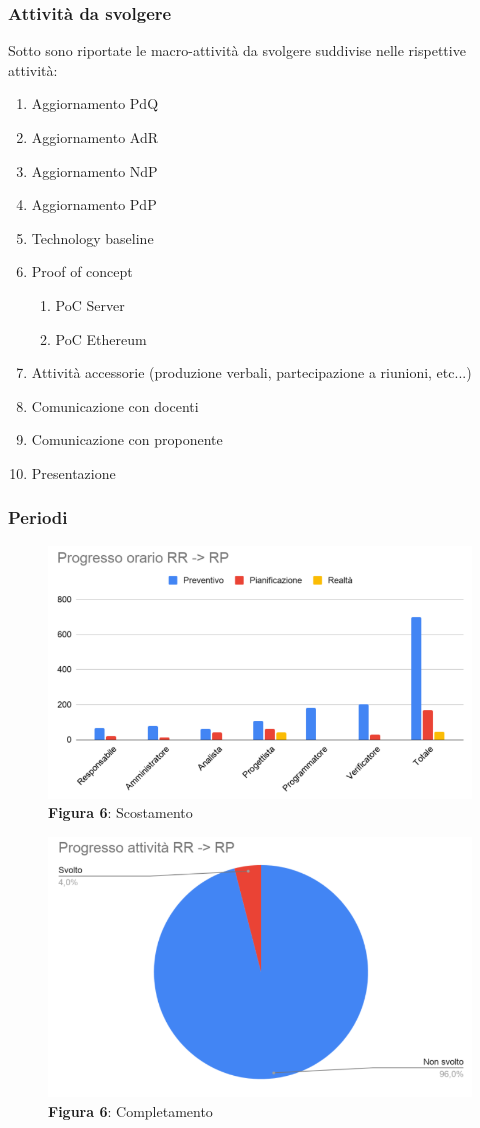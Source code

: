 \subsubsection{Attività da svolgere}
Sotto sono riportate le macro-attività da svolgere suddivise nelle rispettive attività:
\begin{enumerate}
	\item Aggiornamento PdQ
	\item Aggiornamento AdR
	\item Aggiornamento NdP
	\item Aggiornamento PdP
	\item Technology baseline
	\item Proof of concept
	\begin{enumerate}
		\item PoC Server
		\item PoC Ethereum
	\end{enumerate}
	\item Attività accessorie (produzione verbali, partecipazione a riunioni, etc...)
	\item Comunicazione con docenti
	\item Comunicazione con proponente
	\item Presentazione
\end{enumerate}

\subsubsection{Periodi}

\begin{figure}[H]
	\centering
	\includegraphics[width=0.7\linewidth]{res/images/scostamento2.1.png}
	\caption*{\textbf{Figura 6}: Scostamento}
	\label{fig:Figura2}
\end{figure}
\begin{figure}[H]
	\centering
	\includegraphics[width=0.7\linewidth]{res/images/completamento2.1.png}
	\caption*{\textbf{Figura 6}: Completamento}
	\label{fig:Figura2}
\end{figure}
